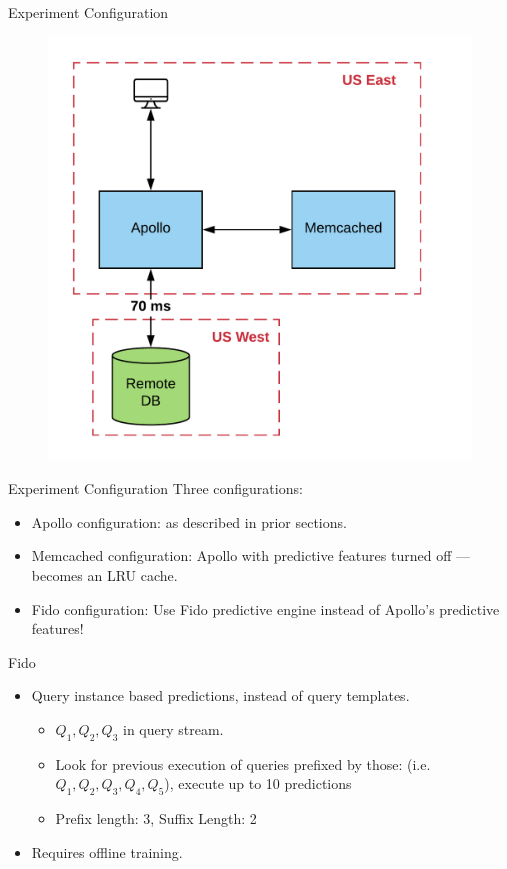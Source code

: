\documentclass[10pt]{beamer}
\begin{document}
\begin{frame}[fragile]{Experiment Configuration}
    \begin{figure}
        \center
        \includegraphics[scale=0.17]{apollo_exp_config}
    \end{figure}
\end{frame}

\begin{frame}[fragile]{Experiment Configuration}
    Three configurations:
    \begin{itemize}
        \item{\alert{Apollo configuration:} as described in prior sections.}
        \item{\alert{Memcached configuration:} Apollo with predictive features turned off --- becomes an LRU cache.}
        \item{\alert{Fido configuration:} Use Fido predictive engine instead of Apollo's predictive features!}
    \end{itemize}
\end{frame}

\begin{frame}[fragile]{Fido}
    \begin{itemize}
        \item{Query instance based predictions, instead of query templates.}
            \begin{itemize}
                \item{$Q_1, Q_2, Q_3$ in query stream.}
                \item{Look for previous execution of queries prefixed by those: (i.e. $Q_1, Q_2, Q_3, Q_4, Q_5$), execute up to 10 predictions}
                \item{Prefix length: 3, Suffix Length: 2}
            \end{itemize}
        \item{Requires offline training.}
    \end{itemize}
\end{frame}
\end{document}
